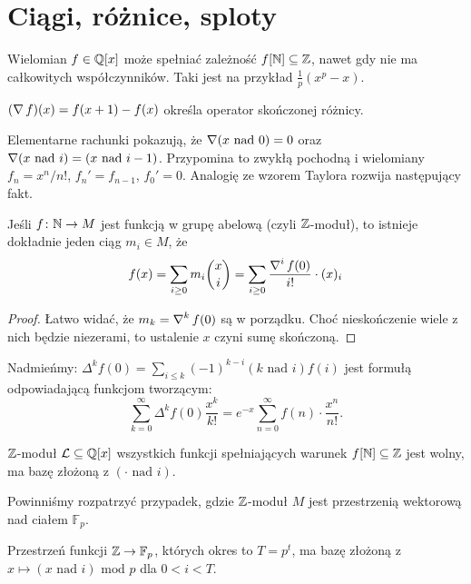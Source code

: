 \section{Ciągi, różnice, sploty} %
Wielomian $f \in \mathbb Q[x]$ może spełniać zależność $f[\mathbb N] \subseteq \mathbb Z$, nawet gdy nie ma całkowitych współczynników.
Taki jest na przykład $\frac 1 p (x^p - x)$.

\begin{definicja}
	$(\operatorname{\nabla} f) (x) = f(x+1) - f(x)$ określa operator skończonej różnicy.
\end{definicja}

Elementarne rachunki pokazują, że $\operatorname{\nabla} (x \mbox{ nad } 0) = 0$ oraz $\operatorname{\nabla} (x \mbox { nad } i) = (x \mbox{ nad } i-1)$.
Przypomina to zwykłą pochodną i wielomiany $f_n = x^n / n!$, $f_n' = f_{n-1}$, $f_0' = 0$.
Analogię ze wzorem Taylora rozwija następujący fakt.

\begin{fakt}
	Jeśli $f \colon \mathbb N \to M$ jest funkcją w grupę abelową (czyli $\mathbb Z$-moduł), to istnieje dokładnie jeden ciąg $m_i \in M$, że
	\[
		f(x) = \sum_{i \ge 0} m_i {x \choose i} = \sum_{i \ge 0} \frac{\operatorname{\nabla}^i f(0)}{i!} \cdot (x)_i
	\]
\end{fakt}

\begin{proof}
	Łatwo widać, że $m_k = \operatorname{\nabla}^k f(0)$ są w porządku.
	Choć nieskończenie wiele z nich będzie niezerami, to ustalenie $x$ czyni sumę skończoną.
\end{proof}

Nadmieńmy: $\Delta^k f(0) = \sum_{i \le k} (-1)^{k-i} (k \mbox { nad } i) f(i)$ jest formułą odpowiadającą funkcjom tworzącym:
\[
	\sum_{k = 0}^\infty \Delta^k f(0)  \frac{x^k}{k!} = e^{-x} \sum_{n=0}^\infty f(n) \cdot \frac{x^n}{n!}.
\]

\begin{fakt}
	$\mathbb Z$-moduł $\mathcal L \subseteq \mathbb Q[x]$ wszystkich funkcji spełniających warunek $f[\mathbb N] \subseteq \mathbb Z$ jest wolny, ma bazę złożoną z $(\cdot \mbox{ nad } i)$.
\end{fakt}

Powinniśmy rozpatrzyć przypadek, gdzie $\mathbb Z$-moduł $M$ jest przestrzenią wektorową nad ciałem $\mathbb F_p$.

\begin{lemat} \label{vietoris}
	Przestrzeń funkcji $\mathbb Z \to \mathbb F_p$, których okres to $T = p^t$, ma bazę złożoną z $x \mapsto (x \mbox{ nad } i) \mbox{ mod }p$ dla $0 < i < T$.
\end{lemat}

